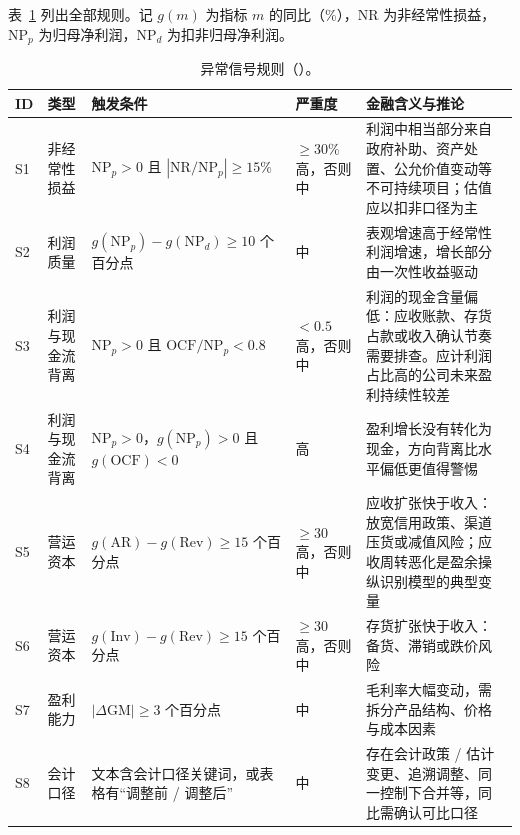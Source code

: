 表~\ref{tab:an-signals} 列出全部规则。记 $g(m)$ 为指标 $m$ 的同比（\%），$\text{NR}$ 为非经常性损益，$\text{NP}_p$ 为归母净利润，$\text{NP}_d$ 为扣非归母净利润。

\begin{table}[p]
\centering
\caption{异常信号规则（）。}
\label{tab:an-signals}
\small
\begin{tabularx}{\linewidth}{l l >{\raggedright\arraybackslash}p{30mm} l X}
\toprule
ID & 类型 & 触发条件 & 严重度 & 金融含义与推论 \\
\midrule
S1 & 非经常性损益 & $\text{NP}_p>0$ 且 $|\text{NR}/\text{NP}_p|\ge15\%$ & $\ge30\%$ 高，否则中 &
利润中相当部分来自政府补助、资产处置、公允价值变动等不可持续项目；估值应以扣非口径为主 \\
S2 & 利润质量 & $g(\text{NP}_p)-g(\text{NP}_d)\ge10$ 个百分点 & 中 &
表观增速高于经常性利润增速，增长部分由一次性收益驱动 \\
S3 & 利润与现金流背离 & $\text{NP}_p>0$ 且 $\text{OCF}/\text{NP}_p<0.8$ & $<0.5$ 高，否则中 &
利润的现金含量偏低：应收账款、存货占款或收入确认节奏需要排查。应计利润占比高的公司未来盈利持续性较差~\citep{sloan1996accruals} \\
S4 & 利润与现金流背离 & $\text{NP}_p>0$，$g(\text{NP}_p)>0$ 且 $g(\text{OCF})<0$ & 高 &
盈利增长没有转化为现金，方向背离比水平偏低更值得警惕 \\
S5 & 营运资本 & $g(\text{AR})-g(\text{Rev})\ge15$ 个百分点 & $\ge30$ 高，否则中 &
应收扩张快于收入：放宽信用政策、渠道压货或减值风险；应收周转恶化是盈余操纵识别模型的典型变量~\citep{beneish1999detection} \\
S6 & 营运资本 & $g(\text{Inv})-g(\text{Rev})\ge15$ 个百分点 & $\ge30$ 高，否则中 &
存货扩张快于收入：备货、滞销或跌价风险 \\
S7 & 盈利能力 & $|\Delta\text{GM}|\ge3$ 个百分点 & 中 &
毛利率大幅变动，需拆分产品结构、价格与成本因素 \\
S8 & 会计口径 & 文本含会计口径关键词，或表格有“调整前 / 调整后” & 中 &
存在会计政策 / 估计变更、追溯调整、同一控制下合并等，同比需确认可比口径 \\
\bottomrule
\end{tabularx}
\end{table}

